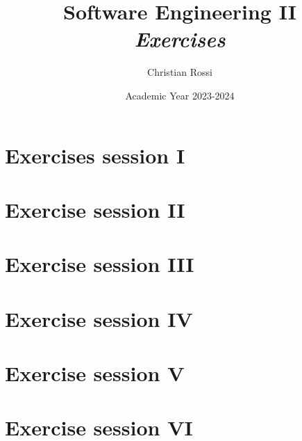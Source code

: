 \documentclass[12pt, a4paper]{report}
\title{Software Engineering II\\ \textit{Exercises}}
\author{Christian Rossi}
\date{Academic Year 2023-2024}
\begin{document}
    \maketitle

    

    \cleardoublepage

    \tableofcontents

    \cleardoublepage

    \chapter{Exercises session I}
    
    

    \chapter{Exercise session II}
    
    

    \chapter{Exercise session III}
    
    

    \chapter{Exercise session IV}
    
    
    

    \chapter{Exercise session V}
    
    
    

    \chapter{Exercise session VI}
    
    
\end{document}
